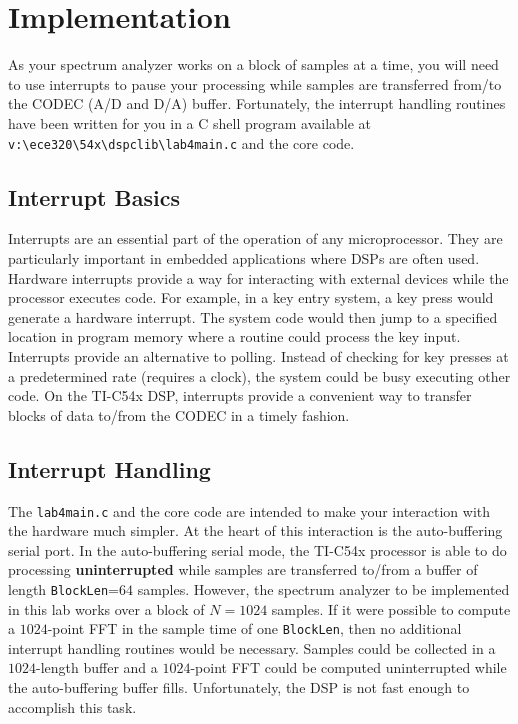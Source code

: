 \section{Implementation}

As your spectrum analyzer works on a block of samples 
at a time, you will need to use interrupts to pause 
your processing while samples are transferred from/to 
the CODEC (A/D and D/A) buffer.  
Fortunately, the interrupt handling routines have been 
written for you in a C shell program available 
at \verb+v:\ece320\54x\dspclib\lab4main.c+ and the 
core code.

\subsection{Interrupt Basics}

Interrupts are an essential part of the operation of 
any microprocessor.  They are particularly important in 
embedded applications where DSPs are often used.  
Hardware interrupts provide a way for interacting with 
external devices while the processor executes code.  
For example, in a key entry system, a key press would 
generate a hardware interrupt.  The system code would then 
jump to a specified location in program memory where a 
routine could process the key input.  Interrupts provide 
an alternative to polling.  Instead of checking for 
key presses at a predetermined rate (requires 
a clock), the system could be busy executing other code.  
On the TI-C54x DSP, interrupts provide a convenient way to
transfer blocks of data to/from the CODEC in a 
timely fashion.

\subsection{Interrupt Handling}

The \verb+lab4main.c+ and the core code are intended to 
make your interaction with the hardware much simpler.  
At the heart of this interaction is the auto-buffering 
serial port.  In the auto-buffering serial mode, the 
TI-C54x processor is able to do processing 
{\bf uninterrupted} while samples are transferred to/from a
buffer of length \verb+BlockLen+=$64$ samples.  
However, the spectrum analyzer to be implemented 
in this lab works over a block of $N=1024$ samples.  
If it were possible to compute a $1024$-point FFT 
in the sample time of one \verb+BlockLen+, then no 
additional interrupt handling routines would be 
necessary.  Samples could be collected in a $1024$-length 
buffer and a $1024$-point FFT could be computed 
uninterrupted while the auto-buffering buffer fills.  
Unfortunately, the DSP is not fast enough to 
accomplish this task.

